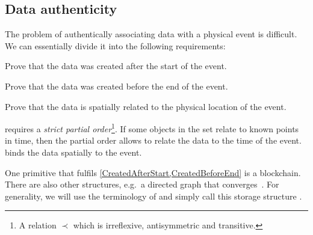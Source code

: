 \subsection{Data authenticity}
\label{DataAuthenticity}

The problem of authentically associating data with a physical event is 
difficult.
We can essentially divide it into the following requirements:
\begin{frame}
\begin{requirements}[A]
  \item\label{CreatedAfterStart} Prove that the data was created after the 
    start of the event.
  \item\label{CreatedBeforeEnd} Prove that the data was created before the end 
    of the event.
  \item\label{SpatiallyRelated} Prove that the data is spatially related to the 
    physical location of the event.
\end{requirements} %

\pause

\end{frame}
 requires a \emph{strict partial 
  order}\footnote{%
  A relation \(\prec\) which is irreflexive, antisymmetric and transitive.
}.
If some objects in the set relate to known points in time, then the partial 
order allows to relate the data to the time of the event.
 binds the data spatially to the event.

One primitive that fulfils \cref{CreatedAfterStart,CreatedBeforeEnd} is a 
blockchain.
There are also other structures, e.g.\ a directed graph that 
converges~\cite{BlockchainFreeCryptocurrencies}.
For generality, we will use the terminology of 
\textcite{BlockchainFreeCryptocurrencies} and simply call this storage 
structure .

